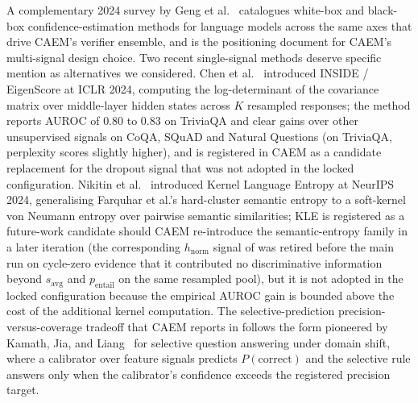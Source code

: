 A complementary 2024 survey by Geng et al.~\cite{geng2024survey} catalogues white-box and black-box confidence-estimation methods for language models across the same axes that drive CAEM's verifier ensemble, and is the positioning document for CAEM's multi-signal design choice. Two recent single-signal methods deserve specific mention as alternatives we considered. Chen et al.~\cite{chen2024inside} introduced INSIDE / EigenScore at ICLR 2024, computing the log-determinant of the covariance matrix over middle-layer hidden states across $K$ resampled responses; the method reports AUROC of $0.80$ to $0.83$ on TriviaQA and clear gains over other unsupervised signals on CoQA, SQuAD and Natural Questions (on TriviaQA, perplexity scores slightly higher), and is registered in CAEM as a candidate replacement for the dropout signal that was not adopted in the locked configuration. Nikitin et al.~\cite{nikitin2024kle} introduced Kernel Language Entropy at NeurIPS 2024, generalising Farquhar et al.'s hard-cluster semantic entropy to a soft-kernel von Neumann entropy over pairwise semantic similarities; KLE is registered as a future-work candidate should CAEM re-introduce the semantic-entropy family in a later iteration (the corresponding $h_{\text{norm}}$ signal of \cite{farquhar2024semantic} was retired before the main run on cycle-zero evidence that it contributed no discriminative information beyond $s_{\text{avg}}$ and $p_{\text{entail}}$ on the same resampled pool), but it is not adopted in the locked configuration because the empirical AUROC gain is bounded above the cost of the additional kernel computation. The selective-prediction precision-versus-coverage tradeoff that CAEM reports in  follows the form pioneered by Kamath, Jia, and Liang~\cite{kamath2020selective} for selective question answering under domain shift, where a calibrator over feature signals predicts $P(\text{correct})$ and the selective rule answers only when the calibrator's confidence exceeds the registered precision target.

